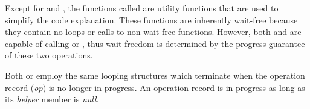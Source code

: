 Except for   and , the functions called are utility functions that are used to simplify the code explanation.
These functions are inherently wait-free because they contain no loops or calls to non-wait-free functions.
However, both  and  are capable of calling  or , thus wait-freedom is determined by the progress guarantee of these two operations.

Both  or  employ the same looping structures which terminate when the operation record (\emph{op}) is no longer in progress. An operation record is in progress as long as its \emph{helper} member is \emph{null}.
